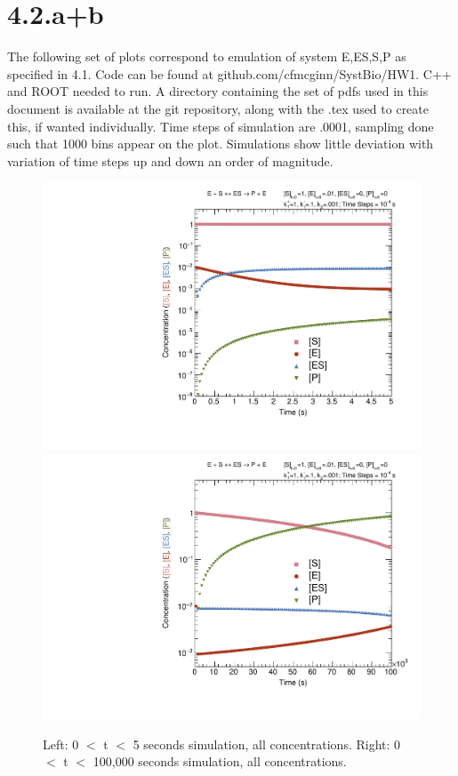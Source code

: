 \documentclass{article}
\begin{document}
\section{4.2.a+b}

The following set of plots correspond to emulation of system E,ES,S,P as specified in 4.1. Code can be found at github.com/cfmcginn/SystBio/HW1. C++ and ROOT needed to run. A directory containing the set of pdfs used in this document is available at the git repository, along with the .tex used to create this, if wanted individually. Time steps of simulation are .0001, sampling done such that 1000 bins appear on the plot. Simulations show little deviation with variation of time steps up and down an order of magnitude.

\begin{figure}[H]
    \centering
    \includegraphics[width=.49\textwidth]{canv5_c.pdf} 
    \includegraphics[width=.49\textwidth]{canv100k_c.pdf}
    \caption{Left: 0 $<$ t $<$ 5 seconds simulation, all concentrations. Right: 0 $<$ t $<$ 100,000 seconds simulation, all concentrations.}
    \label{}
\end{figure}
\end{document}
